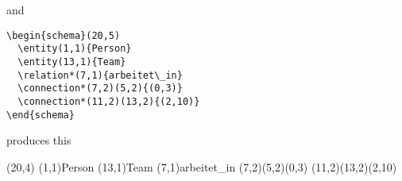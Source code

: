 \documentclass[a4paper,11pt]{article}
\begin{document}
and 

\begin{verbatim}
\begin{schema}(20,5)
  \entity(1,1){Person}
  \entity(13,1){Team}
  \relation*(7,1){arbeitet\_in}
  \connection*(7,2)(5,2){(0,3)}
  \connection*(11,2)(13,2){(2,10)}
\end{schema}
\end{verbatim}

produces this

\begin{schema}(20,4)
  \entity(1,1){Person}
  \entity(13,1){Team}
  \relation*(7,1){arbeitet\_in}
  \connection*(7,2)(5,2){(0,3)}
  \connection*(11,2)(13,2){(2,10)}
\end{schema}
\end{document}
